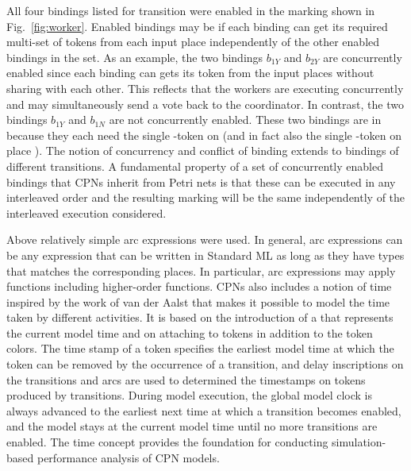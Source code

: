 All four bindings listed for transition 
were enabled in the marking shown in Fig.~\ref{fig:worker}. Enabled
bindings may be  if each binding can get
its required multi-set of tokens from each input place independently
of the other enabled bindings in the set. As an example, the two
bindings $b_{1Y}$ and $b_{2Y}$ are concurrently enabled since each
binding can gets its token from the input places without sharing with
each other. This reflects that the workers are executing concurrently
and may simultaneously send a vote back to the coordinator. In
contrast, the two bindings $b_{1Y}$ and $b_{1N}$ are not concurrently
enabled. These two bindings are in  because they
each need the single -token on  (and in
fact also the single -token on place
). The notion of concurrency and conflict of binding
extends to bindings of different transitions. A fundamental property
of a set of concurrently enabled bindings that CPNs inherit from Petri
nets is that these can be executed in any interleaved order and the
resulting marking will be the same independently of the interleaved
execution considered.

 Above relatively simple arc expressions were used. In general, arc
 expressions can be any expression that can be written in Standard ML
 as long as they have types that matches the corresponding places. In
 particular, arc expressions may apply functions including
 higher-order functions. CPNs also includes a notion of time inspired
 by the work of van der Aalst \cite{X} that makes it possible to model
 the time taken by different activities. It is based on the
 introduction of a  that represents the
 current model time and on attaching  to tokens
 in addition to the token colors. The time stamp of a token specifies
 the earliest model time at which the token can be removed by the
 occurrence of a transition, and delay inscriptions on the transitions
 and arcs are used to determined the timestamps on tokens produced by
 transitions. During model execution, the global model clock is always
 advanced to the earliest next time at which a transition becomes
 enabled, and the model stays at the current model time until no more
 transitions are enabled. The time concept provides the foundation for
 conducting simulation-based performance analysis of CPN models. 


